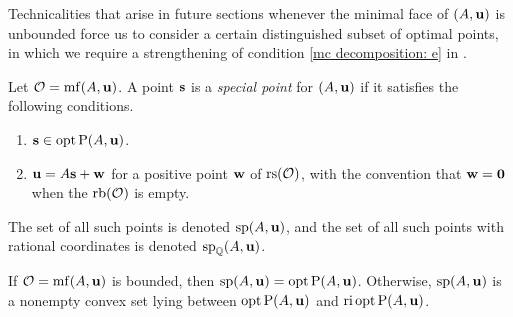 \documentclass[11pt]{amsart}
\begin{document}
Technicalities that arise in future sections whenever the minimal face of $(A, \mathbf{u})$ is unbounded force us to consider a certain distinguished subset of optimal points, in which we require a strengthening of condition \eqref{mc decomposition: e} in .

\begin{definition}
   \label{mc: D}
   Let $\mathcal{O} = \operatorname{mf}(A, \mathbf{u})$.
   A point $\mathbf{s}$ is a \emph{special point} for $(A, \mathbf{u})$ if it satisfies the following conditions.
\begin{enumerate}
\item $\mathbf{s} \in \operatorname{opt} \mathrm{P}(A, \mathbf{u})$.
\item $\mathbf{u} = A \mathbf{s} + \mathbf{w}$ for a positive point $\mathbf{w}$ of $\operatorname{rs}(\mathcal{O})$, with the convention that $\mathbf{w}=\mathbf{0}$ when the $\operatorname{rb}(\mathcal{O})$ is empty.
\end{enumerate}
The set of all such points is denoted $\operatorname{sp}(A, \mathbf{u})$, and the set of all such points with rational coordinates is denoted $\operatorname{sp}_{\mathbb{Q}}(A, \mathbf{u})$.
\end{definition}

\begin{proposition}
   \label{opt versus mc: P}
   If $\mathcal{O} = \operatorname{mf}(A, \mathbf{u})$ is bounded, then $\operatorname{sp}(A, \mathbf{u}) = \operatorname{opt} \mathrm{P}(A, \mathbf{u})$.  Otherwise,  $\operatorname{sp}(A, \mathbf{u})$ is a nonempty convex set lying between $\operatorname{opt} \mathrm{P}(A, \mathbf{u})$ and $\operatorname{ri} \operatorname{opt} \mathrm{P}(A, \mathbf{u})$.
\end{proposition}
\end{document}
